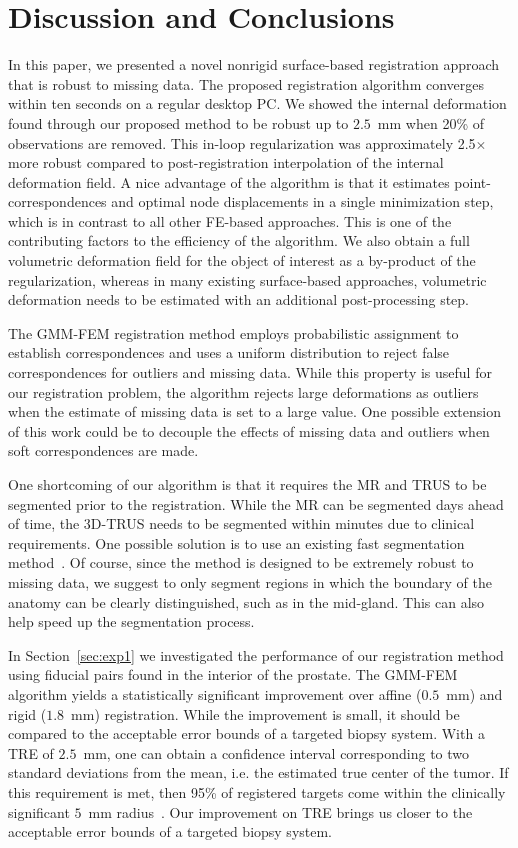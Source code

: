 \documentclass[journal]{IEEEtran}
\begin{document}
\section{Discussion and Conclusions}\label{sec:disc}
In this paper, we presented a novel nonrigid surface-based registration approach that is robust to missing data. The proposed registration algorithm converges within ten seconds on a regular desktop PC. We showed the internal deformation found through our proposed method to be robust up to $2.5$~mm when 20\% of observations are removed. This in-loop regularization was approximately 2.5$\times$ more robust compared to post-registration interpolation of the internal deformation field.  A nice advantage of the algorithm is that it estimates point-correspondences and optimal node displacements in a single minimization step, which is in contrast to all other FE-based approaches.  This is one of the contributing factors to the efficiency of the algorithm.  We also obtain a full volumetric deformation field for the object of interest as a by-product of the regularization, whereas in many existing surface-based approaches, volumetric deformation needs to be estimated with an additional post-processing step.

The GMM-FEM registration method employs probabilistic assignment to establish correspondences and uses a uniform distribution to reject false correspondences for outliers and missing data. While this property is useful for our registration problem, the algorithm rejects large deformations as outliers when the estimate of missing data is set to a large value. One possible extension of this work could be to decouple the effects of missing data and outliers when soft correspondences are made.

One shortcoming of our algorithm is that it requires the MR and TRUS to be segmented prior to the registration. While the MR can be segmented days ahead of time, the 3D-TRUS needs to be segmented within minutes due to clinical requirements. One possible solution is to use an existing fast segmentation method~\cite{Qiu12a}. Of course, since the method is designed to be extremely robust to missing data, we suggest to only segment regions in which the boundary of the anatomy can be clearly distinguished, such as in the mid-gland. This can also help speed up the segmentation process.

In Section~\ref{sec:exp1} we investigated the performance of our registration method using fiducial pairs found in the interior of the prostate. The GMM-FEM algorithm yields a statistically significant improvement over affine ($0.5$~mm) and rigid ($1.8$~mm) registration. While the improvement is small, it should be compared to the acceptable error bounds of a targeted biopsy system. With a TRE of $2.5$~mm, one can obtain a confidence interval corresponding to two standard deviations from the mean, i.e. the estimated true center of the tumor. If this requirement is met, then 95\% of registered targets come within the clinically significant $5$~mm radius~\cite{Karnik10a}. Our improvement on TRE brings us closer to the acceptable error bounds of a targeted biopsy system.
\end{document}
